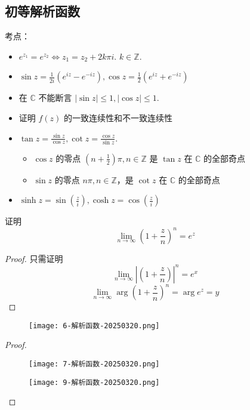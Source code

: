 \subsection{初等解析函数}

考点：

\begin{itemize}
	\item $e^{ z_1 }=e^{ z_2 }\iff z_1=z_2+2k\pi i$. $k\in \mathbb{Z}$.
	\item $\sin z=\frac{1}{2i}(e^{ iz }-e^{ -iz }),\cos z=\frac{1}{2}(e^{ iz }+e^{ -iz })$
	\item 在 $\mathbb{C}$ 不能断言 $\lvert \sin z \rvert\leq1,\lvert \cos z \rvert\leq1$.
	\item 证明 $f(z)$ 的一致连续性和不一致连续性
	\item $\tan z=\frac{\sin z}{\cos z},\cot z=\frac{\cos z}{\sin z}$.
	\begin{itemize}
		\item $\cos z$ 的零点 $\left ( n+\frac{1}{2} \right)\pi, n\in \mathbb{Z}$ 是 $\tan z$ 在 $\mathbb{C}$ 的全部奇点
		\item $\sin z$ 的零点 $n\pi, n\in \mathbb{Z}$，是 $\cot z$ 在 $\mathbb{C}$ 的全部奇点
	\end{itemize}
	\item $\sinh z=\sin\left( \frac{z}{i} \right),\cosh z=\cos\left( \frac{z}{i} \right)$
\end{itemize}

\begin{exercise}
证明
\[
\lim_{ n \to \infty } \left( 1+\frac{z}{n} \right)^{n}=e^{ z }
\]
\end{exercise}
\begin{proof}
只需证明
\[
\lim_{ n \to \infty } \left\lvert  \left( 1+\frac{z}{n} \right)  \right\rvert ^{n}=e^{ x }
\]
\[
\lim_{ n \to \infty } \arg\left( 1+\frac{z}{n} \right)^{n}=\arg e^{ z }=y
\]
\end{proof}

\begin{exercise}
\begin{figure}[H]
\centering
\texttt{[image: 6-解析函数-20250320.png]}
\label{}
\end{figure}
\end{exercise}
\begin{proof}
\begin{figure}[H]
\centering
\texttt{[image: 7-解析函数-20250320.png]}
\label{}
\end{figure}

\begin{figure}[H]
\centering
\texttt{[image: 9-解析函数-20250320.png]}
\label{}
\end{figure}

\end{proof}

